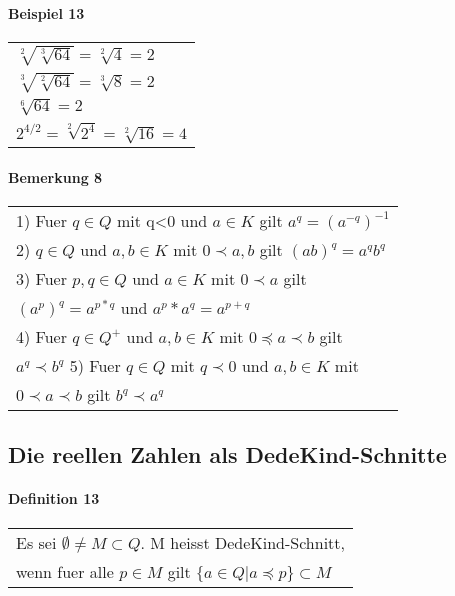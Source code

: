 \documentclass{scrartcl}
\begin{document}
\paragraph{Beispiel 13}
\begin{tabbing}
\begin{tabular}{l}
$\sqrt[2]{\sqrt[3]{64}} = \sqrt[2]{4} = 2$\\
$\sqrt[3]{\sqrt[2]{64}}=\sqrt[3]{8}=2$\\
$\sqrt[6]{64}=2$\\
$2^{4/2} = \sqrt[2]{2^4}=\sqrt[2]{16}=4$
\end{tabular}
\end{tabbing}

\paragraph{Bemerkung 8}
\begin{tabbing}
\begin{tabular}{l}
1) Fuer $q\in Q$ mit q<0 und $a\in K$ gilt $a^q=(a^{-q})^{-1}$\\
2) $q\in Q$ und $a,b\in K$ mit $0\prec a,b$ gilt $(ab)^q=a^qb^q$\\
3) Fuer $p,q \in Q$ und $a\in K$ mit $0\prec a$ gilt\\
$(a^p)^q = a^{p*q}$ und $a^p*a^q = a^{p+q}$\\
4) Fuer $q\in Q^+$ und $a,b\in K$ mit $0 \preceq a \prec b$ gilt\\
$a^q\prec b^q$
5) Fuer $q\in Q$ mit $q\prec 0$ und $a,b\in K$ mit\\
$0 \prec a \prec b$ gilt $b^q \prec a^q$\
\end{tabular}
\end{tabbing}

\subsection{Die reellen Zahlen als DedeKind-Schnitte}

\paragraph{Definition 13}
\begin{tabbing}
\begin{tabular}{l}
Es sei $\emptyset\neq M \subset Q$. M heisst DedeKind-Schnitt,\\
wenn fuer alle $p\in M$ gilt $\{ a\in Q|a\preceq p \}\subset M$
\end{tabular}
\end{tabbing}
\end{document}
